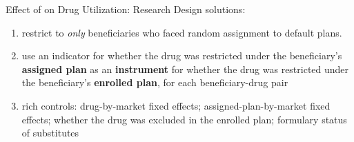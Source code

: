 \begin{frame}{Effect of on Drug Utilization: Research Design}
 solutions: 
 \begin{enumerate}
     \item
     restrict to \textit{only} beneficiaries who faced random assignment to default plans.
   \item use an indicator for whether the drug was restricted under the beneficiary’s \textbf{assigned plan} as an \textbf{instrument} for whether the drug was restricted under the beneficiary’s \textbf{enrolled plan}, for each beneficiary-drug pair
   \item rich controls: drug-by-market fixed effects; assigned-plan-by-market fixed effects; whether the drug was excluded in the enrolled plan; formulary status of substitutes
 \end{enumerate}

\end{frame}